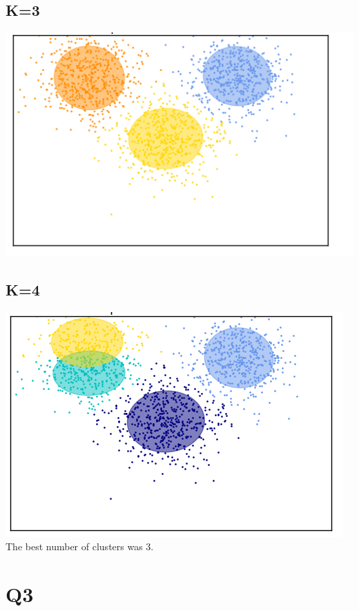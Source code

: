 \documentclass[11]{article}
\begin{document}
\subsection*{K=3}
\includegraphics[scale=0.75]{4.png} \\
\subsection*{K=4}
\includegraphics[scale=0.75]{5.png} \\

The best number of clusters was 3.
 



\section*{Q3}




 
\end{document}
